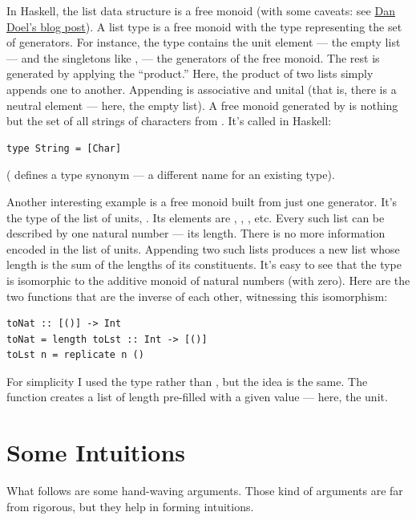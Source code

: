 In Haskell, the list data structure is a free monoid (with some caveats:
see \href{http://comonad.com/reader/2015/free-monoids-in-haskell/}{Dan
Doel's blog post}). A list type \code{{[}a{]}} is a free monoid with
the type  representing the set of generators. For instance,
the type \code{{[}Char{]}} contains the unit element --- the empty
list \code{{[}{]}} --- and the singletons like
\code{{[}\'a\'{]}}, \code{{[}\'b\'{]}} --- the
generators of the free monoid. The rest is generated by applying the
``product.'' Here, the product of two lists simply appends one to
another. Appending is associative and unital (that is, there is a
neutral element --- here, the empty list). A free monoid generated by
 is nothing but the set of all strings of characters from
. It's called  in Haskell:

\begin{verbatim}
type String = [Char]
\end{verbatim}

( defines a type synonym --- a different name for an
existing type).

Another interesting example is a free monoid built from just one
generator. It's the type of the list of units, \code{{[}(){]}}. Its
elements are \code{{[}{]}}, \code{{[}(){]}}, \code{{[}(),\ (){]}},
etc. Every such list can be described by one natural number --- its
length. There is no more information encoded in the list of units.
Appending two such lists produces a new list whose length is the sum of
the lengths of its constituents. It's easy to see that the type
\code{{[}(){]}} is isomorphic to the additive monoid of natural
numbers (with zero). Here are the two functions that are the inverse of
each other, witnessing this isomorphism:

\begin{verbatim}
toNat :: [()] -> Int
toNat = length toLst :: Int -> [()]
toLst n = replicate n ()
\end{verbatim}

For simplicity I used the type  rather than
, but the idea is the same. The function
 creates a list of length  pre-filled with a
given value --- here, the unit.

\section{Some Intuitions}\label{some-intuitions}

What follows are some hand-waving arguments. Those kind of arguments are
far from rigorous, but they help in forming intuitions.

